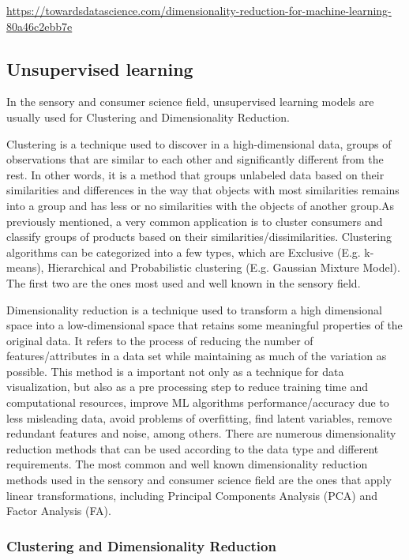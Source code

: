 \documentclass[
]{book}
\begin{document}
\url{https://towardsdatascience.com/dimensionality-reduction-for-machine-learning-80a46c2ebb7e}

\hypertarget{unsupervised-learning}{%
\subsection{Unsupervised learning}\label{unsupervised-learning}}

In the sensory and consumer science field, unsupervised learning models are usually used for Clustering and Dimensionality Reduction.

Clustering is a technique used to discover in a high-dimensional data, groups of observations that are similar to each other and significantly different from the rest. In other words, it is a method that groups unlabeled data based on their similarities and differences in the way that objects with most similarities remains into a group and has less or no similarities with the objects of another group.As previously mentioned, a very common application is to cluster consumers and classify groups of products based on their similarities/dissimilarities. Clustering algorithms can be categorized into a few types, which are Exclusive (E.g. k-means), Hierarchical and Probabilistic clustering (E.g. Gaussian Mixture Model). The first two are the ones most used and well known in the sensory field.

Dimensionality reduction is a technique used to transform a high dimensional space into a low-dimensional space that retains some meaningful properties of the original data. It refers to the process of reducing the number of features/attributes in a data set while maintaining as much of the variation as possible. This method is a important not only as a technique for data visualization, but also as a pre processing step to reduce training time and computational resources, improve ML algorithms performance/accuracy due to less misleading data, avoid problems of overfitting, find latent variables, remove redundant features and noise, among others. There are numerous dimensionality reduction methods that can be used according to the data type and different requirements. The most common and well known dimensionality reduction methods used in the sensory and consumer science field are the ones that apply linear transformations, including Principal Components Analysis (PCA) and Factor Analysis (FA).

\hypertarget{clustering-and-dimensionality-reduction}{%
\subsubsection{Clustering and Dimensionality Reduction}\label{clustering-and-dimensionality-reduction}}
\end{document}
